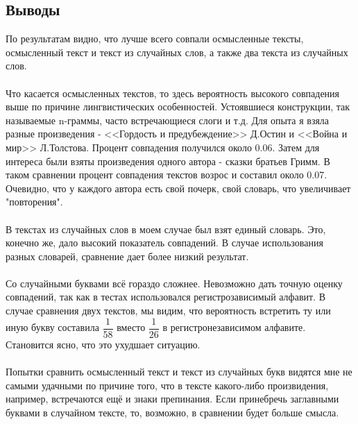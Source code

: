 \documentclass[12pt]{article}
\begin{document}
\subsection*{Выводы}
По результатам видно, что лучше всего совпали осмысленные тексты, осмысленный текст и текст из случайных слов, а также два текста из случайных слов.\\
\\
Что касается осмысленных текстов, то здесь вероятность высокого совпадения выше по причине лингвистических особенностей. Устоявшиеся конструкции, так называемые n-граммы, часто встречающиеся слоги и т.д. Для опыта я взяла разные произведения - <<Гордость и предубеждение>> Д.Остин и <<Война и мир>> Л.Толстова. Процент совпадения получился около 0.06. Затем для интереса были взяты произведения одного автора - сказки братьев Гримм. В таком сравнении процент совпадения текстов возрос и составил около 0.07. Очевидно, что у каждого автора есть свой почерк, свой словарь, что увеличивает "повторения".\\
\\
В текстах из случайных слов в моем случае был взят единый словарь. Это, конечно же, дало высокий показатель совпадений. В случае использования разных словарей, сравнение дает более низкий результат.\\
\\
Со случайными буквами всё гораздо сложнее. Невозможно дать точную оценку совпадений, так как в тестах использовался регистрозависимый алфавит. В случае сравнения двух текстов, мы видим, что вероятность встретить ту или иную букву составила $\dfrac{1}{58}$ вместо $\dfrac{1}{26}$ в регистронезависимом алфавите. Становится ясно, что это ухудшает ситуацию.\\
\\
Попытки сравнить осмысленный текст и текст из случайных букв видятся мне не самыми удачными по причине того, что в тексте какого-либо произвидения, например, встречаются ещё и знаки препинания. Если принебречь заглавными буквами в случайном тексте, то, возможно, в сравнении будет больше смысла.
\end{document}
